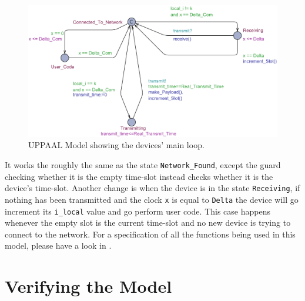 \begin{figure}
  \includegraphics[width=1\textwidth]{Figures/Model/Device_Connected.pdf} 
\caption{UPPAAL Model showing the devices' main loop.}
\label{fig:UPPAAL_Connected}
\end{figure}

It works the roughly the same as the state \texttt{Network\_Found}, except the guard checking whether it is the empty time-slot instead checks whether it is the device's time-slot.
Another change is when the device is in the state \texttt{Receiving}, if nothing has been transmitted and the clock \texttt{x} is equal to \texttt{Delta} the device will go increment its \texttt{i\_local} value and go perform user code. 
This case happens whenever the empty slot is the current time-slot and no new device is trying to connect to the network.
For a specification of all the functions being used in this model, please have a look in .

\section{Verifying the Model}